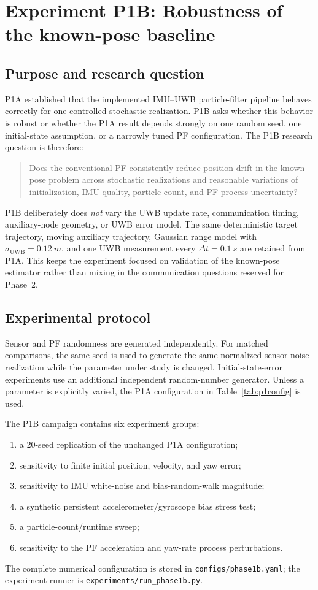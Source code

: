 \section{Experiment P1B: Robustness of the known-pose baseline}
\subsection{Purpose and research question}
P1A established that the implemented IMU--UWB particle-filter pipeline behaves correctly for one controlled stochastic realization. P1B asks whether this behavior is robust or whether the P1A result depends strongly on one random seed, one initial-state assumption, or a narrowly tuned PF configuration. The P1B research question is therefore:
\begin{quote}
Does the conventional PF consistently reduce position drift in the known-pose problem across stochastic realizations and reasonable variations of initialization, IMU quality, particle count, and PF process uncertainty?
\end{quote}

P1B deliberately does \emph{not} vary the UWB update rate, communication timing, auxiliary-node geometry, or UWB error model. The same deterministic target trajectory, moving auxiliary trajectory, Gaussian range model with $\sigma_{\mathrm{UWB}}=\SI{0.12}{m}$, and one UWB measurement every $\Delta t=\SI{0.1}{s}$ are retained from P1A. This keeps the experiment focused on validation of the known-pose estimator rather than mixing in the communication questions reserved for Phase~2.

\subsection{Experimental protocol}
Sensor and PF randomness are generated independently. For matched comparisons, the same seed is used to generate the same normalized sensor-noise realization while the parameter under study is changed. Initial-state-error experiments use an additional independent random-number generator. Unless a parameter is explicitly varied, the P1A configuration in Table~\ref{tab:p1config} is used.

The P1B campaign contains six experiment groups:
\begin{enumerate}
    \item a 20-seed replication of the unchanged P1A configuration;
    \item sensitivity to finite initial position, velocity, and yaw error;
    \item sensitivity to IMU white-noise and bias-random-walk magnitude;
    \item a synthetic persistent accelerometer/gyroscope bias stress test;
    \item a particle-count/runtime sweep;
    \item sensitivity to the PF acceleration and yaw-rate process perturbations.
\end{enumerate}
The complete numerical configuration is stored in \texttt{configs/phase1b.yaml}; the experiment runner is \texttt{experiments/run\_phase1b.py}.

